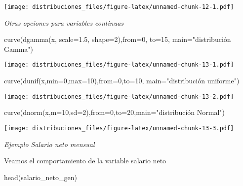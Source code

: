 \documentclass[
]{article}
\newenvironment{Shaded}{\begin{snugshade}}{\end{snugshade}}
\newcommand{\AttributeTok}[1]{\textcolor[rgb]{0.77,0.63,0.00}{#1}}
\newcommand{\DecValTok}[1]{\textcolor[rgb]{0.00,0.00,0.81}{#1}}
\newcommand{\FloatTok}[1]{\textcolor[rgb]{0.00,0.00,0.81}{#1}}
\newcommand{\FunctionTok}[1]{\textcolor[rgb]{0.00,0.00,0.00}{#1}}
\newcommand{\NormalTok}[1]{#1}
\newcommand{\StringTok}[1]{\textcolor[rgb]{0.31,0.60,0.02}{#1}}
\begin{document}
\texttt{[image: distribuciones\_files/figure-latex/unnamed-chunk-12-1.pdf]}

\emph{Otras opciones para variables continuas }

\begin{Shaded}
\begin{Highlighting}[]
\FunctionTok{curve}\NormalTok{(}\FunctionTok{dgamma}\NormalTok{(x, }\AttributeTok{scale=}\FloatTok{1.5}\NormalTok{, }\AttributeTok{shape=}\DecValTok{2}\NormalTok{),}\AttributeTok{from=}\DecValTok{0}\NormalTok{, }\AttributeTok{to=}\DecValTok{15}\NormalTok{, }\AttributeTok{main=}\StringTok{"distribución Gamma"}\NormalTok{)}
\end{Highlighting}
\end{Shaded}

\texttt{[image: distribuciones\_files/figure-latex/unnamed-chunk-13-1.pdf]}

\begin{Shaded}
\begin{Highlighting}[]
\FunctionTok{curve}\NormalTok{(}\FunctionTok{dunif}\NormalTok{(x,}\AttributeTok{min=}\DecValTok{0}\NormalTok{,}\AttributeTok{max=}\DecValTok{10}\NormalTok{),}\AttributeTok{from=}\DecValTok{0}\NormalTok{,}\AttributeTok{to=}\DecValTok{10}\NormalTok{, }\AttributeTok{main=}\StringTok{"distribución uniforme"}\NormalTok{)}
\end{Highlighting}
\end{Shaded}

\texttt{[image: distribuciones\_files/figure-latex/unnamed-chunk-13-2.pdf]}

\begin{Shaded}
\begin{Highlighting}[]
\FunctionTok{curve}\NormalTok{(}\FunctionTok{dnorm}\NormalTok{(x,}\AttributeTok{m=}\DecValTok{10}\NormalTok{,}\AttributeTok{sd=}\DecValTok{2}\NormalTok{),}\AttributeTok{from=}\DecValTok{0}\NormalTok{,}\AttributeTok{to=}\DecValTok{20}\NormalTok{,}\AttributeTok{main=}\StringTok{"distribución Normal"}\NormalTok{)}
\end{Highlighting}
\end{Shaded}

\texttt{[image: distribuciones\_files/figure-latex/unnamed-chunk-13-3.pdf]}

\emph{Ejemplo Salario neto mensual}

Veamos el comportamiento de la variable salario neto

\begin{Shaded}
\begin{Highlighting}[]
\FunctionTok{head}\NormalTok{(salario\_neto\_gen)}
\end{Highlighting}
\end{Shaded}
\end{document}
